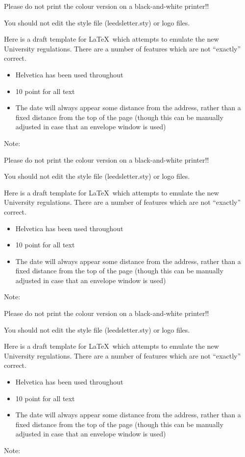 \documentclass[a4paper]{letter}
\begin{document}
\begin{letter}
{Please do not print the colour version on a black-and-white printer!! 

You should not edit the style file (leedsletter.sty) or logo files. }


\medskip 
Here is a draft template for  \LaTeX\ which attempts to emulate the new University regulations.  There are a number of features which are not ``exactly'' correct. 
\begin{itemize} 
\item Helvetica has been used throughout 
\item 10 point for all text  
\item  The date will always appear some distance from the address, rather than a fixed distance from the top of the page (though this can be manually adjusted in case that  
an envelope window is used) 
\end{itemize}
Note:
{\bf 

Please do not print the colour version on a black-and-white printer!! 

You should not edit the style file (leedsletter.sty) or logo files. }


\medskip 
Here is a draft template for  \LaTeX\ which attempts to emulate the new University regulations.  There are a number of features which are not ``exactly'' correct. 
\begin{itemize} 
\item Helvetica has been used throughout 
\item 10 point for all text  
\item  The date will always appear some distance from the address, rather than a fixed distance from the top of the page (though this can be manually adjusted in case that  
an envelope window is used) 
\end{itemize}
Note:
{\bf 

Please do not print the colour version on a black-and-white printer!! 

You should not edit the style file (leedsletter.sty) or logo files. }


\medskip 
Here is a draft template for  \LaTeX\ which attempts to emulate the new University regulations.  There are a number of features which are not ``exactly'' correct. 
\begin{itemize} 
\item Helvetica has been used throughout 
\item 10 point for all text  
\item  The date will always appear some distance from the address, rather than a fixed distance from the top of the page (though this can be manually adjusted in case that  
an envelope window is used) 
\end{itemize}
Note:
{\bf 

}
\end{letter}
\end{document}
